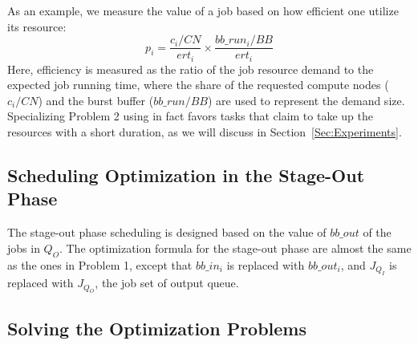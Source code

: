 As an example, we measure the value of a job based on how efficient one utilize its resource:
\begin{equation}
        p_i = \frac{c_i / CN}{ert_i} \times \frac{bb\_run_i / BB}{ert_i}
        \label{Equ:DefValue}
\end{equation}
Here, efficiency is measured as the ratio of the job resource demand to the expected job running time,
where the share of the requested compute nodes ($c_i/CN$) and the burst buffer ($bb\_run/BB$) are used to
represent the demand size.
Specializing Problem 2 using  in fact favors tasks that claim to take up the resources with a short duration, as we will discuss in Section~\ref{Sec:Experiments}.

\subsection{Scheduling Optimization in the Stage-Out Phase}

The stage-out phase scheduling is designed based on the value of $bb\_out$ of the jobs in $Q_O$.
The optimization formula for the stage-out phase are almost the same as the ones in Problem 1, except that $bb\_in_i$ is replaced with $bb\_out_i$, and
$J_{Q_I}$ is replaced with $J_{Q_O}$, the job set of output queue.


\subsection{Solving the Optimization Problems}

